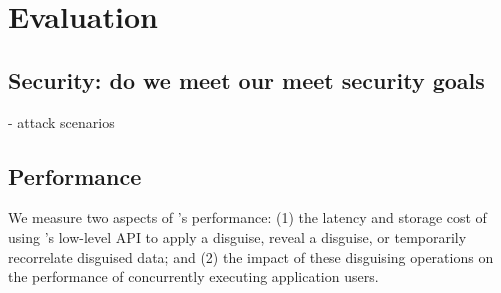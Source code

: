 \section{Evaluation}
\subsection{Security: do we meet our meet security goals}
   - attack scenarios

\subsection{Performance}
We measure two aspects of \sys's performance: (1) the latency and storage cost of using \sys's
low-level API to apply a disguise, reveal a disguise, or temporarily recorrelate disguised data; and
(2) the impact of these disguising operations on the performance of concurrently executing
application users.


